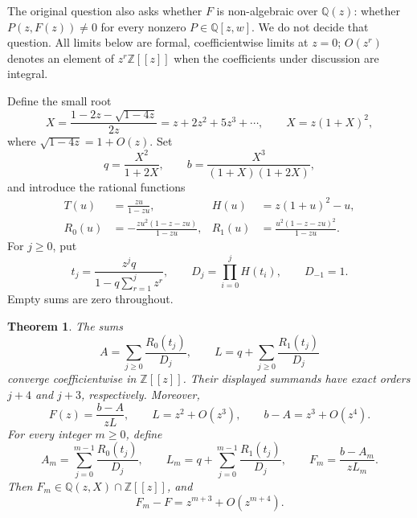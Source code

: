 \documentclass[11pt]{article}
\newtheorem{theorem}{Theorem}
\newcommand{\Z}{\mathbb Z}
\newcommand{\Q}{\mathbb Q}
\begin{document}
The original question also asks whether $F$ is non-algebraic over $\Q(z)$:
whether $P(z,F(z))\ne0$ for every nonzero $P\in\Q[z,w]$.
We do not decide that question. All limits below are formal,
coefficientwise limits at $z=0$; $O(z^r)$ denotes an element of
$z^r\Z[[z]]$ when the coefficients under discussion are integral.

Define the small root
\begin{equation}\label{eq:X}
 X=\frac{1-2z-\sqrt{1-4z}}{2z}
   =z+2z^2+5z^3+\cdots,\qquad X=z(1+X)^2,
\end{equation}
where $\sqrt{1-4z}=1+O(z)$. Set
\begin{equation}\label{eq:qb}
 q=\frac{X^2}{1+2X},\qquad
 b=\frac{X^3}{(1+X)(1+2X)},
\end{equation}
and introduce the rational functions
\begin{align}
 T(u)&=\frac{zu}{1-zu}, & H(u)&=z(1+u)^2-u,\label{eq:TH}\\
 R_0(u)&=-\frac{zu^2(1-z-zu)}{1-zu}, &
 R_1(u)&=\frac{u^2(1-z-zu)^2}{1-zu}.\label{eq:R}
\end{align}
For $j\ge0$, put
\begin{equation}\label{eq:orbit}
 t_j=\frac{z^jq}{1-q\sum_{r=1}^jz^r},\qquad
 D_j=\prod_{i=0}^jH(t_i),\qquad D_{-1}=1.
\end{equation}
Empty sums are zero throughout.

\begin{theorem}\label{thm:quotient}
The sums
\begin{equation}\label{eq:sums}
 A=\sum_{j\ge0}\frac{R_0(t_j)}{D_j},\qquad
 L=q+\sum_{j\ge0}\frac{R_1(t_j)}{D_j}
\end{equation}
converge coefficientwise in $\Z[[z]]$. Their displayed summands have
exact orders $j+4$ and $j+3$, respectively. Moreover,
\begin{equation}\label{eq:quotient}
 F(z)=\frac{b-A}{zL},\qquad
 L=z^2+O(z^3),\qquad b-A=z^3+O(z^4).
\end{equation}
For every integer $m\ge0$, define
\begin{equation}\label{eq:finite}
 A_m=\sum_{j=0}^{m-1}\frac{R_0(t_j)}{D_j},\qquad
 L_m=q+\sum_{j=0}^{m-1}\frac{R_1(t_j)}{D_j},\qquad
 F_m=\frac{b-A_m}{zL_m}.
\end{equation}
Then $F_m\in\Q(z,X)\cap\Z[[z]]$, and
\begin{equation}\label{eq:contact}
 F_m-F=z^{m+3}+O(z^{m+4}).
\end{equation}
\end{theorem}
\end{document}
